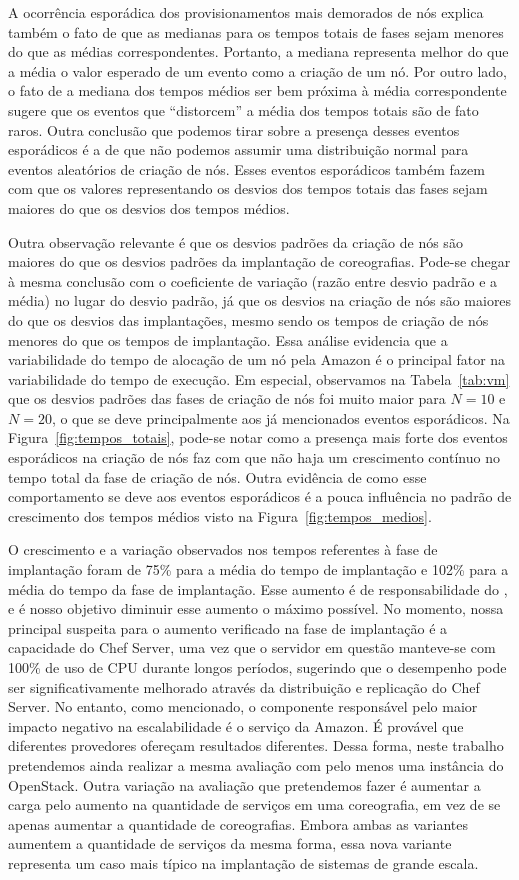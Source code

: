 A ocorrência esporádica dos provisionamentos mais demorados de nós explica também o fato de que as medianas para os tempos totais de fases sejam menores do que as médias correspondentes. Portanto, a mediana representa melhor do que a média o valor esperado de um evento como a criação de um nó. Por outro lado, o fato de a mediana dos tempos médios ser bem próxima à média correspondente sugere que os eventos que ``distorcem'' a média dos tempos totais são de fato raros. Outra conclusão que podemos tirar sobre a presença desses eventos esporádicos é a de que não podemos assumir uma distribuição normal para eventos aleatórios de criação de nós. Esses eventos esporádicos também fazem com que os valores representando os desvios dos tempos totais das fases sejam maiores do que os desvios dos tempos médios. 

Outra observação relevante é que os desvios padrões da criação de nós são maiores do que os desvios padrões da implantação de coreografias. Pode-se chegar à mesma conclusão com o coeficiente de variação (razão entre desvio padrão e a média) no lugar do desvio padrão, já que os desvios na criação de nós são maiores do que os desvios das implantações, mesmo sendo os tempos de criação de nós menores do que os tempos de implantação. Essa análise evidencia que a variabilidade do tempo de alocação de um nó pela Amazon é o principal fator na variabilidade do tempo de execução. Em especial, observamos na Tabela~\ref{tab:vm} que os desvios padrões das fases de criação de nós foi muito maior para $N=10$ e $N=20$, o que se deve principalmente aos já mencionados eventos esporádicos. Na Figura~\ref{fig:tempos_totais}, pode-se notar como a presença mais forte dos eventos esporádicos na criação de nós faz com que não haja um crescimento contínuo no tempo total da fase de criação de nós. Outra evidência de como esse comportamento se deve aos eventos esporádicos é a pouca influência no padrão de crescimento dos tempos médios visto na Figura~\ref{fig:tempos_medios}.

O crescimento e a variação observados nos tempos referentes à fase de implantação foram de 75\% para a média do tempo de implantação e 102\%  para a média do tempo da fase de implantação. Esse aumento é de responsabilidade do \ee, e é nosso objetivo diminuir esse aumento o máximo possível. No momento, nossa principal suspeita para o aumento verificado na fase de implantação é a capacidade do Chef Server, uma vez que o servidor em questão manteve-se com 100\% de uso de CPU durante longos períodos, sugerindo que o desempenho pode ser significativamente melhorado através da distribuição e replicação do Chef Server. No entanto, como mencionado, o componente responsável pelo maior impacto negativo na escalabilidade é o serviço da Amazon. É provável que diferentes provedores ofereçam resultados diferentes. Dessa forma, neste trabalho pretendemos ainda realizar a mesma avaliação com pelo menos uma instância do OpenStack. Outra variação na avaliação que pretendemos fazer é aumentar a carga pelo aumento na quantidade de serviços em uma coreografia, em vez de se apenas aumentar a quantidade de coreografias. Embora ambas as variantes aumentem a quantidade de serviços da mesma forma, essa nova variante representa um caso mais típico na implantação de sistemas de grande escala.

